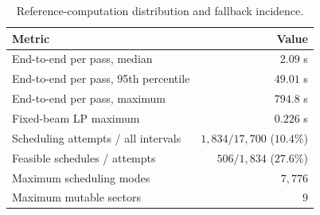 \begin{table}[t]
\caption{Reference-computation distribution and fallback incidence.}
\label{tab:runtime-v2}
\centering
\footnotesize
\setlength{\tabcolsep}{3.0pt}
\renewcommand{\arraystretch}{1.05}
\begin{tabular}{@{}lr@{}}
\toprule
Metric & Value\\
\midrule
End-to-end per pass, median & $2.09$ s\\
End-to-end per pass, 95th percentile & $49.01$ s\\
End-to-end per pass, maximum & $794.8$ s\\
Fixed-beam LP maximum & $0.226$ s\\
Scheduling attempts / all intervals & $1,834/17,700$ ($10.4\%$)\\
Feasible schedules / attempts & $506/1,834$ ($27.6\%$)\\
Maximum scheduling modes & $7,776$\\
Maximum mutable sectors & $9$\\
\bottomrule
\end{tabular}
\end{table}

